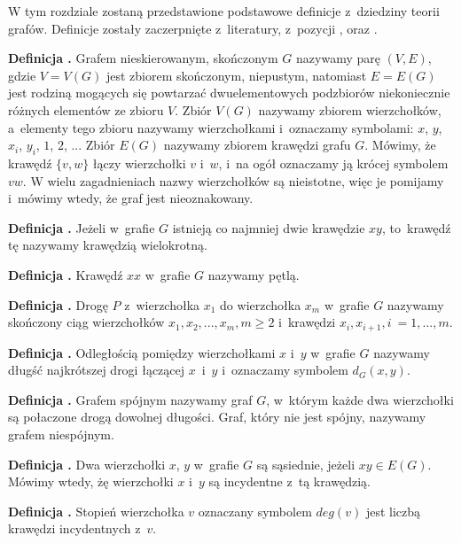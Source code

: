 W tym rozdziale zostaną przedstawione podstawowe definicje z~dziedziny teorii grafów.
Definicje zostały zaczerpnięte z~literatury, z~pozycji \cite{Wloch2008}, \cite{Wilson2012} oraz \cite{Wojciechwoski2013}.

\noindent
\textbf{Definicja .}
\incrementdefinitionIndex
Grafem nieskierowanym, skończonym $G$ nazywamy parę $(V,E)$, gdzie $V = V(G)$ jest zbiorem skończonym, niepustym,
natomiast $E = E(G)$ jest rodziną mogących się powtarzać dwuelementowych podzbiorów niekoniecznie różnych elementów ze zbioru $V$.
Zbiór $V(G)$ nazywamy zbiorem wierzchołków, a~elementy tego zbioru nazywamy wierzchołkami i~oznaczamy symbolami:
$x$, $y$, $x_i$, $y_i$, $1$, $2$, ... Zbiór $E(G)$ nazywamy zbiorem krawędzi grafu $G$.
Mówimy, że krawędź $\{v, w\}$ łączy wierzchołki $v$ i~$w$, i~na ogół oznaczamy ją krócej symbolem $vw$.
W wielu zagadnieniach nazwy wierzchołków są nieistotne, więc je pomijamy i~mówimy wtedy, że graf jest nieoznakowany.

\noindent
\textbf{Definicja .}
\incrementdefinitionIndex
Jeżeli w~grafie $G$ istnieją co najmniej dwie krawędzie $xy$, to~krawędź tę nazywamy krawędzią wielokrotną.

\noindent
\textbf{Definicja .}
\incrementdefinitionIndex
Krawędź $xx$ w~grafie $G$ nazywamy pętlą.

\noindent
\textbf{Definicja .}
\incrementdefinitionIndex
Drogę $P$ z~wierzchołka $x_1$ do wierzchołka $x_m$ w~grafie $G$ nazywamy skończony ciąg wierzchołków
$x_1, x_2, ..., x_m, m \geqslant 2$ i~krawędzi ${x_i, x_{i + 1}}, i~= 1, ..., m$.

\noindent
\textbf{Definicja .}
\incrementdefinitionIndex
Odległością pomiędzy wierzchołkami $x$ i~$y$ w~grafie $G$ nazywamy długść najkrótszej drogi łączącej $x$~i~$y$
i~oznaczamy symbolem $d_G(x,y)$.

\noindent
\textbf{Definicja .}
\incrementdefinitionIndex
Grafem spójnym nazywamy graf $G$, w~którym każde dwa wierzchołki są połaczone drogą dowolnej długości.
Graf, który nie jest spójny, nazywamy grafem niespójnym.

\noindent
\textbf{Definicja .}
\incrementdefinitionIndex
Dwa wierzchołki $x$, $y$ w~grafie $G$ są sąsiednie, jeżeli $xy \in E(G)$.
Mówimy wtedy, żę wierzchołki $x$ i~$y$ są incydentne z~tą krawędzią.

\noindent
\textbf{Definicja .}
\incrementdefinitionIndex
Stopień wierzchołka $v$ oznaczany symbolem $deg(v)$ jest liczbą krawędzi incydentnych z~$v$.

